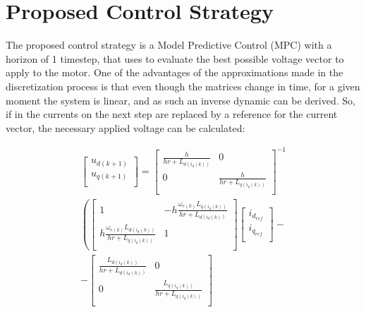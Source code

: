 \documentclass[9pt,conference]{IEEEtran}
\begin{document}
\section{Proposed Control Strategy}
The proposed control strategy is a Model Predictive Control (MPC) with a horizon of 1 timestep, that uses  to evaluate the best possible voltage vector to apply to the motor. One of the advantages of the approximations made in the discretization process is that even though the matrices change in time, for a given moment the system is linear, and as such an inverse dynamic can be derived. So, if in  the currents on the next step are replaced by a reference for the current vector, the necessary applied voltage can be calculated:

\begin{equation}
	\begin{aligned}
		\begin{bmatrix}
			u_{d(k+1)} \\
			u_{q(k+1)} \\
		\end{bmatrix}
		=
		\begin{bmatrix}
			\frac{h}{hr+L_{d(i_d(k))}} & 0                          \\
			0                          & \frac{h}{hr+L_{q(i_q(k))}} \\
		\end{bmatrix}^{-1} \\
		\left(
		\begin{bmatrix}
				1                                                    & -h\frac{\omega_{e(k)}L_{q(i_q(k))}}{hr+L_{d(i_d(k))}} \\
				h\frac{\omega_{e(k)}L_{d(i_d(k))}}{hr+L_{q(i_q(k))}} & 1                                                     \\
        \end{bmatrix}
		\begin{bmatrix}
				i_{d_{ref}} \\
				i_{q_{ref}} \\
        \end{bmatrix}
        \right. -\\-
		\begin{bmatrix}
				\frac{L_{d(i_d(k))}}{hr+L_{d(i_d(k))}} & 0                                      \\
				0                                      & \frac{L_{q(i_q(k))}}{hr+L_{q(i_q(k))}} \\

\end{bmatrix}
\end{aligned}
\end{equation}
\end{document}
